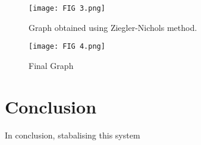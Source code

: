 \documentclass{article}
\numberwithin{equation}{section}
\begin{document}
\begin{figure}
    \centering
    \texttt{[image: FIG 3.png]}
    \caption{Graph obtained using Ziegler-Nichols method.}
    \label{fig:enter-label}
\end{figure}
\begin{figure}
    \centering
    \texttt{[image: FIG 4.png]}
    \caption{Final Graph}
    \label{fig:enter-label}
\end{figure}

\newpage
\section{Conclusion}
In conclusion, stabalising this system 
\end{document}
